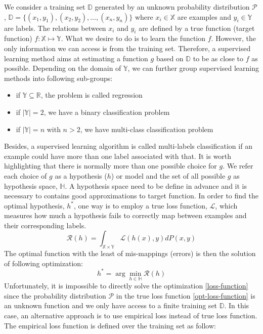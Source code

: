 We consider a training set $\mathbb{D}$ generated by an unknown probability distribution $\mathcal{P}$,  $\mathbb{D} = \lbrace (x_1, y_1), (x_2, y_2),\ldots, (x_n, y_n)  \rbrace$ where $x_i \in \mathbb{X}$ are examples and $y_i \in \mathbb{Y}$ are labels. The relations between $x_i$ and $y_i$ are defined by a true function (target function) $f: \mathbb{X}\longmapsto \mathbb{Y}$. What we desire to do is to learn the function $f$. However, the only information we can access is from the training set. Therefore, a supervised learning method aims at estimating a function $g$ based on $\mathbb{D}$ to be as close to $f$ as possible. Depending on the domain of $\mathbb{Y}$, we can further group supervised learning methods into following sub-groups:
\begin{itemize}
	\item if $\mathbb{Y} \subseteq \mathbb{R}$, the problem is called regression
	\item if $\left\vert{\mathbb{Y}}\right\vert = 2$, we have a binary classification problem
	\item if $\left\vert{\mathbb{Y}}\right\vert = n$ with $n>2$, we have multi-class classification problem
\end{itemize}
Besides, a supervised learning algorithm is called multi-labels classification if an example could have more than one label associated with that. It is worth highlighting that there is normally more than one possible choice for $g$. We refer each choice of $g$ as a hypothesis ($h$) or model and the set of all possible $g$ as hypothesis space, $\mathbb{H}$. A hypothesis space need to be define in advance and it is necessary to contains good approximations to target function. In order to find the optimal hypothesis, $h^*$, one way is to employ a true loss function, $\mathcal{L}$, which measures how much a hypothesis fails to correctly map between examples and their corresponding labels.
\begin{equation}
\label{loss-function}
\mathcal{R}(h) = \int_{\mathbb{X}\times \mathbb{Y}}^{} \mathcal{L}(h(x),y)dP(x,y)
\end{equation}
The optimal function with the least of mis-mappings (errors) is then the solution of following optimization:
\begin{equation}
\label{opt-loss-function}
h^{*} = \arg\min_{h \in \mathbb{H}}\mathcal{R}(h)
\end{equation}
Unfortunately, it is impossible to directly solve the optimization \ref{loss-function} since the probability distribution $\mathcal{P}$ in the true loss function \ref{opt-loss-function} is an unknown function and we only have access to a finite training set $\mathbb{D}$. In this case, an alternative approach is to use empirical loss instead of true loss function. The empirical loss function is defined over the training set as follow:
